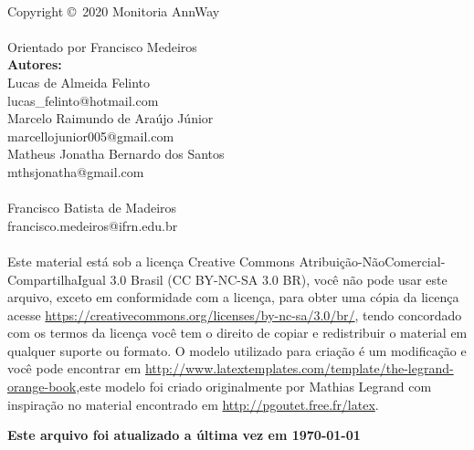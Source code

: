 \newpage
~\vfill
\thispagestyle{empty}

\noindent Copyright \copyright\ 2020 Monitoria AnnWay\\ %

\\ %
{Orientado por Francisco Medeiros}\\ %

\noindent \textbf{Autores:}\\
{Lucas de Almeida Felinto}\\ %
{lucas\_felinto@hotmail.com}\\
{Marcelo Raimundo de Araújo Júnior}\\ %
{marcellojunior005@gmail.com}\\
{Matheus Jonatha Bernardo dos Santos}\\ %
{mthsjonatha@gmail.com}\\

\\
{Francisco Batista de Madeiros}\\
{francisco.medeiros@ifrn.edu.br}\\

\\ %

Este material está sob a licença Creative Commons Atribuição-NãoComercial-CompartilhaIgual 3.0 Brasil (CC BY-NC-SA 3.0 BR), você não pode usar este arquivo, exceto em conformidade com a licença, para obter uma cópia da licença acesse \url{https://creativecommons.org/licenses/by-nc-sa/3.0/br/}, tendo concordado com os termos da licença você tem o direito de copiar e redistribuir o material em qualquer suporte ou formato. O modelo utilizado para criação é um modificação e você pode encontrar em \url{http://www.latextemplates.com/template/the-legrand-orange-book},este modelo foi criado originalmente por Mathias Legrand com inspiração no material encontrado em \url{http://pgoutet.free.fr/latex}.

\vspace{1cm}
\noindent \textbf{Este arquivo foi atualizado a última vez em \today}
